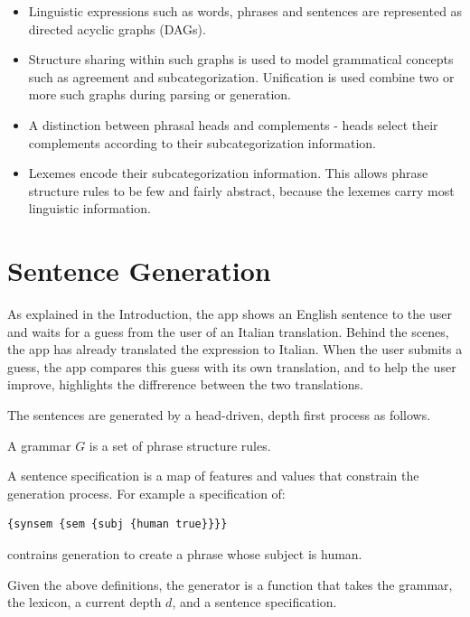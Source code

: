 \documentclass[11pt]{article}
\begin{document}
\begin{itemize}
\item Linguistic expressions such as words, phrases and sentences are
represented as directed acyclic graphs (DAGs).

\item Structure sharing within such graphs is used to model
  grammatical concepts such as agreement and
  subcategorization. Unification is used combine two or more such
  graphs during parsing or generation.

\item A distinction between phrasal heads and complements - heads select
their complements according to their subcategorization information.

\item Lexemes encode their subcategorization information. This allows
phrase structure rules to be few and fairly abstract, because the
lexemes carry most linguistic information.
\end{itemize}

\section{Sentence Generation}

As explained in the Introduction, the app shows an English sentence to
the user and waits for a guess from the user of an Italian
translation. Behind the scenes, the app has already translated the
expression to Italian. When the user submits a guess, the app compares
this guess with its own translation, and to help the user improve,
highlights the diffrerence between the two translations. 

The sentences are generated by a head-driven, depth first process as
follows.

A grammar $G$ is a set of phrase structure rules.

A sentence specification is a map of features and values that
constrain the generation process. For example a specification of:

\begin{verbatim}
{synsem {sem {subj {human true}}}}
\end{verbatim}

contrains generation to create a phrase whose subject is human.

Given the above definitions, the generator is a function that takes
the grammar, the lexicon, a current depth $d$, and a sentence
specification. 
\end{document}
